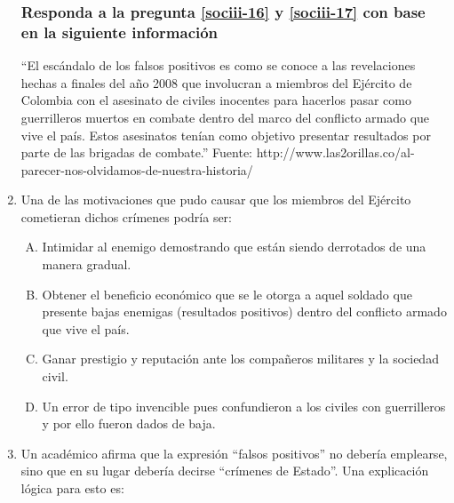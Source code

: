 \begin{enumerate}
\newpage
\subsubsection*{Responda a la pregunta \ref{sociii-16} y \ref{sociii-17} con base en la siguiente información}

``El escándalo de los falsos positivos es como se conoce a las revelaciones hechas a finales del año 2008 que involucran a miembros del Ejército de Colombia con el asesinato de civiles inocentes para hacerlos pasar como guerrilleros muertos en combate dentro del marco del conflicto armado que vive el país. Estos asesinatos tenían como objetivo presentar resultados por parte de las brigadas de combate.'' {\footnotesize Fuente: http://www.las2orillas.co/al-parecer-nos-olvidamos-de-nuestra-historia/}

\item Una de las motivaciones que pudo causar que los miembros del Ejército cometieran dichos crímenes podría ser:\label{sociii-16}


\begin{enumerate}[(A)]
\item   Intimidar al enemigo demostrando que están siendo derrotados de una manera gradual. 
 \item  Obtener el beneficio económico que se le otorga a aquel soldado que presente bajas enemigas (resultados positivos) dentro del conflicto armado que vive el país.
\item Ganar prestigio y reputación ante los compañeros militares y la sociedad civil.
\item Un error de tipo invencible pues confundieron a los civiles con guerrilleros y por ello fueron dados de baja.
\end{enumerate}


\newpage
\item Un académico afirma que la expresión ``falsos positivos'' no debería emplearse, sino que en su lugar debería decirse ``crímenes de Estado''. Una explicación lógica para esto es:\label{sociii-17}



\end{enumerate}
